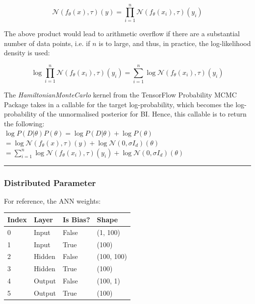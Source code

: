 \documentclass[conference]{IEEEtran}
\begin{document}
\begin{equation*}
	\mathcal{N}(f_\theta(x), \tau)(y) = \prod_{i=1}^n \mathcal{N}(f_\theta(x_i), \tau)(y_i)
\end{equation*}

The above product would lead to arithmetic overflow if there are a substantial number of data points, i.e. if $n$ is to large, and thus, in practice, the log-likelihood density is used:

\begin{equation*}
	\log \prod_{i=1}^n \mathcal{N}(f_\theta(x_i), \tau)(y_i) = \sum_{i=1}^n \log \mathcal{N}(f_\theta(x_i), \tau)(y_i)
\end{equation*}

The \textit{HamiltonianMonteCarlo} kernel from the TensorFlow Probability MCMC Package takes in a callable for the target log-probability, which becomes the log-probability of the unnormalised posterior for BI. Hence, this callable is to return the following:\\

$\log P(D|\theta)P(\theta) = \log P(D|\theta) + \log P(\theta)$\\

$= \log \mathcal{N}(f_\theta(x), \tau)(y) + \log \mathcal{N}(0, \sigma I_d)(\theta)$\\

$\displaystyle = \sum_{i=1}^n \log \mathcal{N}(f_\theta(x_i), \tau)(y_i) + \log \mathcal{N}(0, \sigma I_d)(\theta)$\\

\par\noindent\rule{0.49\textwidth}{0.1pt}

\subsubsection{Distributed Parameter}
For reference, the ANN weights:\\

\begin{tabular}{| m{1.5cm} | m{1.5cm} | m{1.5cm} | m{1.5cm} |}
    \hline
    \textbf{Index} & \textbf{Layer} & \textbf{Is Bias?}& \textbf{Shape}\\
    \hline
    0 & Input & False & (1, 100)\\
    \hline
    1 & Input & True & (100)\\
    \hline
    2 & Hidden & False & (100, 100)\\
    \hline
    3 & Hidden & True & (100)\\
    \hline
    4 & Output & False & (100, 1)\\
    \hline
    5 & Output & True & (100)\\
    \hline
\end{tabular}\\~\\
\end{document}

